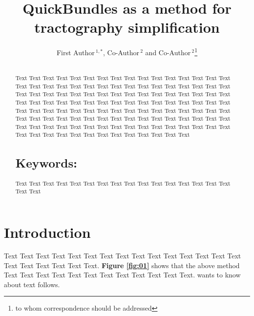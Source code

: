 \documentclass{bioinfo}
\begin{document}

\title[short Title]{QuickBundles as a method for tractography simplification}
\author[Sample {et~al}]{First Author\,$^{1,*}$, Co-Author\,$^{2}$ and Co-Author\,$^2$\footnote{to whom correspondence should be addressed}}
\address{$^{1}$Department of XXXXXXX, Address XXXX etc.\\
$^{2}$Department of XXXXXXXX, Address XXXX etc.}

\history{}

\editor{}

\maketitle

\begin{abstract}

\section{}
Text Text Text  Text Text Text Text Text Text Text Text
Text  Text Text Text Text Text Text Text Text Text  Text Text Text Text Text Text Text Text Text  Text Text Text Text Text Text Text Text Text  Text Text Text Text Text Text Text Text Text  Text Text Text Text Text Text Text Text Text  Text Text Text Text Text Text  Text Text Text Text Text Text Text Text Text  Text Text Text Text Text Text Text Text Text  Text Text Text Text Text Text Text Text Text  Text Text Text Text Text Text Text  Text Text Text Text Text Text Text Text Text  Text Text Text Text Text Text Text Text Text  Text Text Text Text Text Text Text Text Text  Text

\section{Keywords:} Text Text Text Text Text Text  Text Text Text Text Text Text Text Text Text  Text Text Text
\end{abstract}


\section{Introduction}

Text Text Text Text Text Text  Text Text Text Text Text Text Text Text Text  Text Text Text Text Text Text. \textbf{Figure \ref{fig:01}} shows that the above method  Text Text Text Text  Text Text Text Text Text Text  Text Text.  \citep{Bag01} wants to know about text follows.
\end{document}
